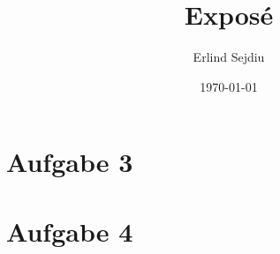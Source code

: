 \documentclass[11pt]{article}
\title{Expos\'e}
\author{Erlind Sejdiu}
\date{\today}
\begin{document}
\maketitle

\section{Aufgabe 3}

\section{Aufgabe 4}
\end{document}
